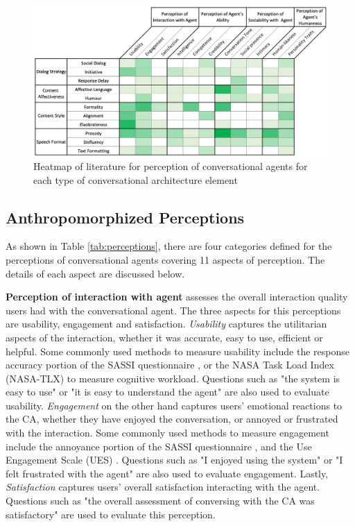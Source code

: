 \documentclass[sigconf,screen,review, anonymous]{acmart}
\newcommand{\cmt}[1]{}%
\begin{document}
\begin{figure}[]
  \centering
  \includegraphics[width=\textwidth]{fig-heatmap-impact.png}
  \caption{Heatmap of literature for perception of conversational agents for each type of conversational architecture element}
  \label{fig:heatmap-impact}
\end{figure}

\subsection{Anthropomorphized Perceptions}

As shown in Table \ref{tab:perceptions}, there are four categories defined for the perceptions of conversational agents covering 11 aspects of perception. The details of each aspect are discussed below.

\textbf{Perception of interaction with agent} assesses the overall interaction quality users had with the conversational agent. The three aspects for this perceptions are usability, engagement and satisfaction. \textit{Usability} captures the utilitarian aspects of the interaction, whether it was accurate, easy to use, efficient or helpful. Some commonly used methods to measure usability include the response accuracy portion of the SASSI questionnaire \cite{hone2000towards}\cmt{sassi}, or the NASA Task Load Index (NASA-TLX) \cite{hart1988development}\cmt{nasa} to measure cognitive workload. Questions such as "the system is easy to use" or "it is easy to understand the agent" are also used to evaluate usability. \textit{Engagement} on the other hand captures users' emotional reactions to the CA, whether they have enjoyed the conversation, or annoyed or frustrated with the interaction. Some commonly used methods to measure engagement include the annoyance portion of the SASSI questionnaire \cite{hone2000towards}\cmt{sassi}, and the Use Engagement Scale (UES) \cite{o2018practical}\cmt{ues}. Questions such as "I enjoyed using the system" or "I felt frustrated with the agent" are also used to evaluate engagement. Lastly, \textit{Satisfaction} captures users' overall satisfaction interacting with the agent. Questions such as "the overall assessment of conversing with the CA was satisfactory" are used to evaluate this perception.
\end{document}
